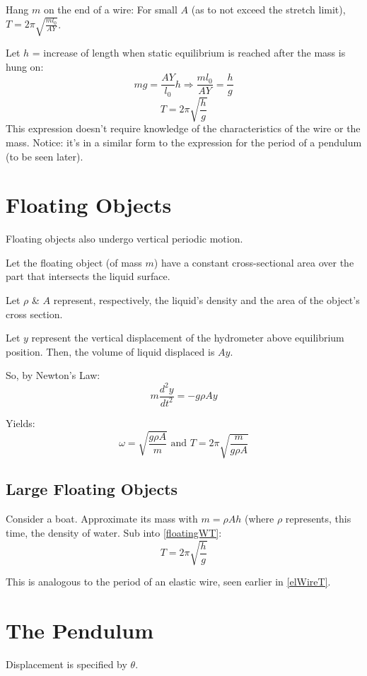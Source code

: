 \documentclass[11pt,letterpaper,titlepage,oneside]{book}
\begin{document}
Hang $m$ on the end of a wire:
For small $A$ (as to not exceed the stretch limit), $T=2\pi\sqrt{\frac{ml_0}{AY}}$.

Let $h$ = increase of length when static equilibrium is reached after the mass is hung on:
\[ mg=\frac{AY}{l_0}h \Longrightarrow \frac{ml_0}{AY}=\frac{h}{g} \]
\begin{equation}
T=2\pi\sqrt{\frac{h}{g}} \label{elWireT}
\end{equation} 
This expression doesn't require knowledge of the characteristics of the wire or the mass.
Notice: it's in a similar form to the expression for the period of a pendulum (to be seen later).

\section{Floating Objects}
Floating objects also undergo vertical periodic motion.

Let the floating object (of mass $m$) have a constant cross-sectional area over the part that intersects the liquid surface.

Let $\rho$ \& $A$ represent, respectively, the liquid's density and the area of the object's cross section. 

Let $y$ represent the vertical displacement of the hydrometer above equilibrium position. Then, the volume of liquid displaced is $Ay$. 

So, by Newton's Law:
\[ m\frac{d^2y}{dt^2} = -g\rho Ay \]

Yields: \begin{equation} \omega = \sqrt{\frac{g\rho A}{m}} \text{ and } T = 2\pi\sqrt{\frac{m}{g\rho A}} \label{floatingWT} \end{equation}

\subsection{Large Floating Objects}
Consider a boat. Approximate its mass with $ m = \rho Ah$ (where $\rho$ represents, this time, the density of water. Sub into \eqref{floatingWT}:
\begin{equation} T = 2\pi\sqrt{\frac{h}{g}} \end{equation}

This is analogous to the period of an elastic wire, seen earlier in \eqref{elWireT}. 

\section{The Pendulum}
Displacement is specified by $\theta$. 
\end{document}
